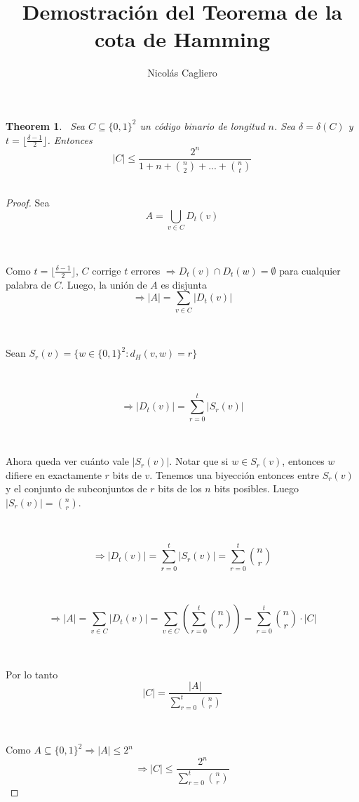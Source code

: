 \documentclass[11pt]{article}
\title{Demostración del Teorema de la cota de Hamming}
\author{Nicolás Cagliero}
\newtheorem{theorem}{Theorem}
\begin{document}
\maketitle
\begin{theorem}\par
\
Sea $C \subseteq \{0, 1\}^{2}$ un código binario de longitud $n$. Sea $\delta = \delta(C)$ y $t = \lfloor \frac{\delta - 1}{2} \rfloor$. Entonces \[|C| \le \frac{2^{n}}{1 + n + \binom{n}{2} + ... + \binom{n}{t}}\]
\

\end{theorem}

\begin{proof} Sea \[A = \bigcup_{v \in C} D_t(v)\] \par
\

Como $t = \lfloor \frac{\delta - 1}{2} \rfloor$, $C$ corrige $t$ errores $\Rightarrow D_t(v) \cap D_t(w) = \emptyset$ para cualquier palabra de $C$. Luego, la unión de $A$ es disjunta \[\Rightarrow |A| = \sum_{v \in C} |D_t(v)|\]\par
\

Sean $S_r(v) = \{w \in \{0, 1\}^{2} : d_H(v, w) = r \} $\par
\

\[\Rightarrow |D_t(v)| = \sum_{r = 0}^{t} |S_r(v)|\]\par
\

Ahora queda ver cuánto vale $|S_r(v)|$. Notar que si $w \in S_r(v)$, entonces $w$ difiere en exactamente $r$ bits de $v$. Tenemos una biyección entonces entre $S_r(v)$ y el conjunto de subconjuntos de $r$ bits de los $n$ bits posibles. Luego $|S_r(v)| = \binom{n}{r}$.\par
\

\[\Rightarrow |D_t(v)| = \sum_{r = 0}^{t} |S_r(v)| = \sum_{r = 0}^{t} \binom{n}{r}\]\par
\

\[\Rightarrow |A| = \sum_{v \in C} |D_t(v)| = \sum_{v \in C}(\sum_{r = 0}^{t} \binom{n}{r}) = \sum_{r = 0}^{t} \binom{n}{r} \cdot |C|\]\par
\

Por lo tanto \[|C| = \frac{|A|}{\displaystyle\sum_{r = 0}^{t} \binom{n}{r}}\]\par
\

Como $A \subseteq \{0, 1\}^{2} \Rightarrow |A| \le 2^{n}$ \[\Rightarrow |C| \le \frac{2^{n}}{\displaystyle\sum_{r = 0}^{t} \binom{n}{r}}\]

\end{proof}
\end{document}
